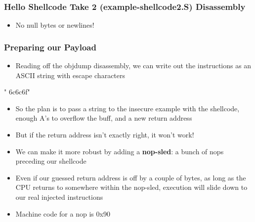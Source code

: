 \documentclass[11pt,xcolor=dvipsnames]{beamer}
\newcommand{\mvs}{\vspace{-0.95em}}
\begin{document}
\begin{frame}[fragile,t]
\frametitle{Hello Shellcode Take 2 (example-shellcode2.S) Disassembly}
\mvs
{}
\begin{itemize}
  \item No null bytes or newlines!
\end{itemize}
\end{frame}


\begin{frame}[fragile,t]
\frametitle{Preparing our Payload}
\begin{itemize}
  \item Reading off the {\ttfamily objdump} disassembly, we can write out the instructions as an ASCII string with escape characters
\end{itemize}
\begin{textcode}
"\xeb{}\xdb{}\xcd
{}\xcd{}\xff\xff\xff{}\x6c\x6c\x6f"
\end{textcode}
\pause
\begin{itemize}
  \item So the plan is to pass a string to the insecure example with the shellcode, enough A's to overflow the buff, and a new return address
\pause
  \item But if the return address isn't exactly right, it won't work!
\pause
  \item We can make it more robust by adding a \textbf{nop-sled}: a bunch of nops preceding our shellcode
  \item Even if our guessed return address is off by a couple of bytes, as long as the CPU returns to somewhere within the nop-sled, execution will slide down to our real injected instructions
  \item Machine code for a {\ttfamily nop} is {\ttfamily 0x90}
\end{itemize}
\end{frame}
\end{document}
